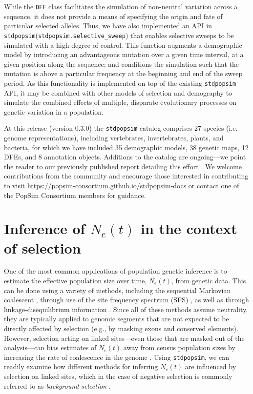 \documentclass[hidelinks]{article}
\newcommand{\stdpopsim}{\texttt{stdpopsim}\xspace}
\begin{document}
    While the \texttt{DFE} class facilitates the simulation of non-neutral variation across a sequence,
    it does not provide a means of specifying the origin and fate of particular selected alleles.
    Thus, we have also implemented an API in \stdpopsim (\texttt{stdpopsim.selective\_sweep}) that enables 
    selective sweeps to be simulated with a high degree of control.
    This function augments a demographic model by introducing an advantageous mutation over a given time interval,
    at a given position along the sequence; and conditions the simulation such that the mutation is above a particular 
    frequency at the beginning and end of the sweep period.
    As this functionality is implemented on top of the existing \stdpopsim API, it may be combined with other 
    models of selection and demography to simulate the combined effects of multiple, disparate evolutionary processes
    on genetic variation in a population.


    At this release (version 0.3.0) the \stdpopsim catalog comprises 27 species (i.e. genome representations),
    including vertebrates, invertebrates, plants, and bacteria,
    for which we have included 35 demographic models, 38 genetic maps, 12 DFEs, and 8 annotation objects. %
    Additions to the catalog are ongoing---we point the reader to our previously published
    report detailing this effort \citep{lauterbur2023expanding}. We welcome contributions from the
    community and encourage those interested in contributing to visit \url{https://popsim-consortium.github.io/stdpopsim-docs}
    or contact one of the PopSim Consortium members for guidance.



    \section*{Inference of $N_e(t)$ in the context of selection}
    One of the most common applications of population genetic inference is to estimate
    the effective population size over time, $N_e(t)$, from genetic data. This can be done
    using a variety of methods, including the sequential Markovian coalescent
    \citep{li2011inference,Schiffels2020,terhorst2017robust},
    through use of the site frequency spectrum (SFS) \citep{liu2020stairway},
    as well as through linkage-disequilibrium information \citep{santiago2020recent}.
    Since all of these methods assume neutrality, they are typically applied to genomic
    segments that are not expected to be directly affected by selection (e.g., by masking exons
    and conserved elements).
    However, selection acting on linked sites---even those that are masked out of the
    analysis---can bias estimates of $N_e(t)$
    away from census population sizes by increasing the
    rate of coalescence in the genome \citep[e.g.][]{schrider2016effects}.
    Using \stdpopsim, we can readily examine how different methods for inferring $N_e(t)$
    are influenced by selection on linked sites,
    which in the case of negative selection is commonly referred to as \emph{background selection}
    \citep{charlesworth1993effect,hudson1995deleterious}.
\end{document}
